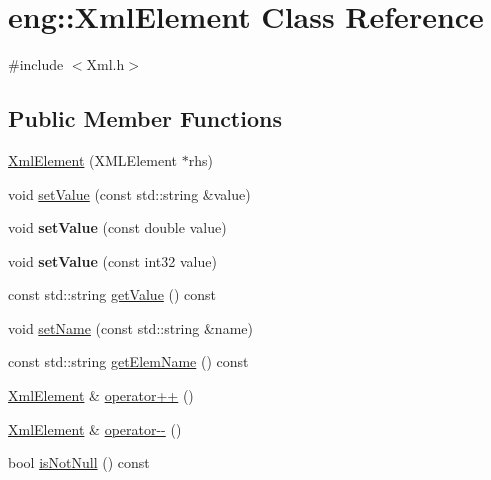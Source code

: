 \hypertarget{classeng_1_1_xml_element}{}\section{eng\+:\+:Xml\+Element Class Reference}
\label{classeng_1_1_xml_element}


{\ttfamily \#include $<$Xml.\+h$>$}

\subsection*{Public Member Functions}
\begin{DoxyCompactItemize}
\item 
\hyperlink{classeng_1_1_xml_element_aa5d6d580352db5da1a58989084fc2c2d}{Xml\+Element} (X\+M\+L\+Element $\ast$rhs)
\item 
void \hyperlink{classeng_1_1_xml_element_aecffb2d9c194c2fbb87213176cefda0b}{set\+Value} (const std\+::string \&value)
\item 
\mbox{\label{classeng_1_1_xml_element_a987091095d4e1f461739edb5b1565d7d}} 
void {\bfseries set\+Value} (const double value)
\item 
\mbox{\label{classeng_1_1_xml_element_a0e445baa631e2dce0cade742a9008ef6}} 
void {\bfseries set\+Value} (const int32 value)
\item 
const std\+::string \hyperlink{classeng_1_1_xml_element_a280c2de45c58aef6daf1babd240423b7}{get\+Value} () const
\item 
void \hyperlink{classeng_1_1_xml_element_afaf40a52510d1d5b443ebb0c2938a552}{set\+Name} (const std\+::string \&name)
\item 
const std\+::string \hyperlink{classeng_1_1_xml_element_a65d1de88005f7f59e4ca20f1595d1afb}{get\+Elem\+Name} () const
\item 
\hyperlink{classeng_1_1_xml_element}{Xml\+Element} \& \hyperlink{classeng_1_1_xml_element_a68253afd7af7d8690cc22bc85c005308}{operator++} ()
\item 
\hyperlink{classeng_1_1_xml_element}{Xml\+Element} \& \hyperlink{classeng_1_1_xml_element_a11472f3e2b4f8226058a5fcba89c2d2a}{operator-\/-\/} ()
\item 
bool \hyperlink{classeng_1_1_xml_element_aa6f71f5cae1976653f4067e309b7b3c9}{is\+Not\+Null} () const
\item 
\mbox{\label{classeng_1_1_xml_element_a6ececbdcfa0444e3aef10254c9641548}} 

\end{DoxyCompactItemize}
